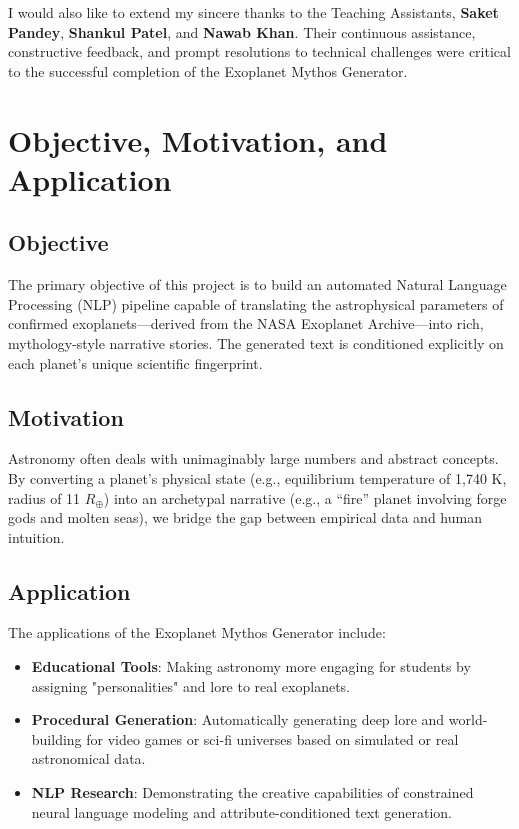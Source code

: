 \documentclass[12pt,a4paper]{report}
\begin{document}
I would also like to extend my sincere thanks to the Teaching Assistants, \textbf{Saket Pandey}, \textbf{Shankul Patel}, and \textbf{Nawab Khan}. Their continuous assistance, constructive feedback, and prompt resolutions to technical challenges were critical to the successful completion of the Exoplanet Mythos Generator.

\tableofcontents
\newpage

\chapter{Objective, Motivation, and Application}

\section{Objective}
The primary objective of this project is to build an automated Natural Language Processing (NLP) pipeline capable of translating the astrophysical parameters of confirmed exoplanets—derived from the NASA Exoplanet Archive—into rich, mythology-style narrative stories. The generated text is conditioned explicitly on each planet's unique scientific fingerprint.

\section{Motivation}
Astronomy often deals with unimaginably large numbers and abstract concepts. By converting a planet's physical state (e.g., equilibrium temperature of 1,740 K, radius of 11 $R_\oplus$) into an archetypal narrative (e.g., a ``fire'' planet involving forge gods and molten seas), we bridge the gap between empirical data and human intuition.

\section{Application}
The applications of the Exoplanet Mythos Generator include:
\begin{itemize}
    \item \textbf{Educational Tools}: Making astronomy more engaging for students by assigning "personalities" and lore to real exoplanets.
    \item \textbf{Procedural Generation}: Automatically generating deep lore and world-building for video games or sci-fi universes based on simulated or real astronomical data.
    \item \textbf{NLP Research}: Demonstrating the creative capabilities of constrained neural language modeling and attribute-conditioned text generation.
\end{itemize}
\end{document}
